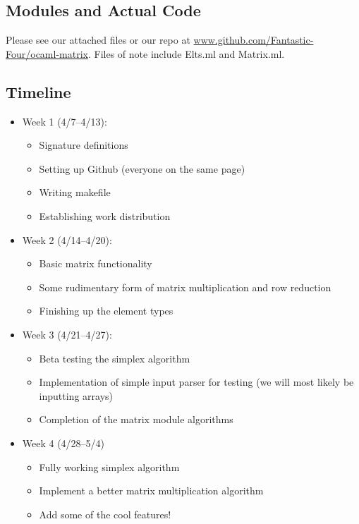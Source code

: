 \documentclass[letterpaper,11pt]{article}
\begin{document}
\subsection{Modules and Actual Code}
Please see our attached files or our repo at 
\url{www.github.com/Fantastic-Four/ocaml-matrix}. Files of note include Elts.ml
and Matrix.ml. 

\subsection{Timeline}
\begin{itemize}
\item Week 1 (4/7--4/13):
  \begin{itemize}
    \item Signature definitions 
    \item Setting up Github (everyone on the same page)
    \item Writing makefile
    \item Establishing work distribution
  \end{itemize}

\item Week 2 (4/14--4/20):
  \begin{itemize}
    \item Basic matrix functionality
    \item Some rudimentary form of matrix multiplication and row reduction
    \item Finishing up the element types
  \end{itemize}

\item Week 3 (4/21--4/27):
  \begin{itemize}
    \item Beta testing the simplex algorithm
    \item Implementation of simple input parser for testing (we will most likely
be inputting arrays)
    \item Completion of the matrix module algorithms
  \end{itemize}

\item Week 4 (4/28--5/4)
  \begin{itemize}
    \item Fully working simplex algorithm
    \item Implement a better matrix multiplication algorithm
    \item Add some of the cool features!
  \end{itemize}
\end{itemize}
\end{document}
